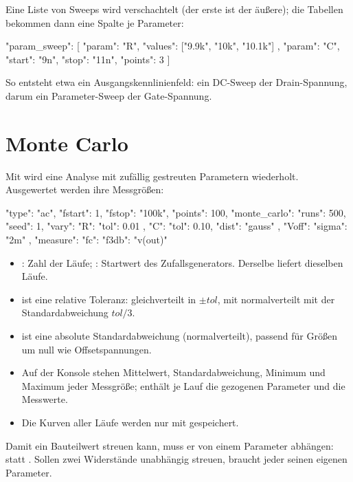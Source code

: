 Eine Liste von Sweeps wird verschachtelt (der erste ist der äußere); die
Tabellen bekommen dann eine Spalte je Parameter:

\begin{json}
"param_sweep": [ { "param": "R", "values": ["9.9k", "10k", "10.1k"] },
                 { "param": "C", "start": "9n", "stop": "11n", "points": 3 } ]
\end{json}

So entsteht etwa ein Ausgangskennlinienfeld: ein DC-Sweep der
Drain-Spannung, darum ein Parameter-Sweep der Gate-Spannung.

\section{Monte Carlo}

Mit  wird eine Analyse mit zufällig gestreuten
Parametern wiederholt. Ausgewertet werden ihre Messgrößen:

\begin{json}
{ "type": "ac", "fstart": 1, "fstop": "100k", "points": 100,
  "monte_carlo": { "runs": 500, "seed": 1,
                   "vary": { "R":    { "tol": 0.01 },
                             "C":    { "tol": 0.10, "dist": "gauss" },
                             "Voff": { "sigma": "2m" } } },
  "measure": { "fc": { "f3db": "v(out)" } } }
\end{json}

\begin{itemize}
  \item {}: Zahl der Läufe; : Startwert des
    Zufallsgenerators. Derselbe  liefert dieselben Läufe.
  \item {} ist eine relative Toleranz: gleichverteilt in
    $\pm\mathit{tol}$, mit  normalverteilt mit der
    Standardabweichung $\mathit{tol}/3$.
  \item {} ist eine absolute Standardabweichung (normalverteilt),
    passend für Größen um null wie Offsetspannungen.
  \item Auf der Konsole stehen Mittelwert, Standardabweichung, Minimum und
    Maximum jeder Messgröße;  enthält je
    Lauf die gezogenen Parameter und die Messwerte.
  \item Die Kurven aller Läufe werden nur mit 
    gespeichert.
\end{itemize}

\begin{hinweis}
  Damit ein Bauteilwert streuen kann, muss er von einem Parameter
  abhängen:  statt . Sollen zwei
  Widerstände unabhängig streuen, braucht jeder seinen eigenen Parameter.
\end{hinweis}

